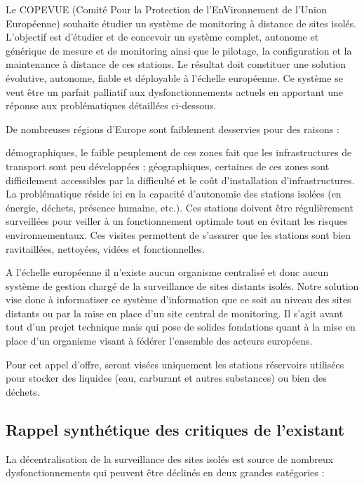 \documentclass[a4paper]{article}
\begin{document}
Le COPEVUE (Comité Pour la Protection de l'EnVironnement de l'Union Européenne) souhaite étudier un système de monitoring à distance de sites isolés. L'objectif est d'étudier et de concevoir un système complet, autonome et générique de mesure et de monitoring ainsi que le pilotage, la configuration et la maintenance à distance de ces stations. Le résultat doit constituer une solution évolutive, autonome, fiable et déployable à l'échelle européenne. Ce système se veut être un parfait palliatif aux dysfonctionnements actuels en apportant une réponse aux problématiques détaillées ci-dessous.

De nombreuses régions d'Europe sont faiblement desservies pour des raisons :

démographiques, le faible peuplement de ces zones fait que les infrastructures de transport sont peu développées ;
géographiques, certaines de ces zones sont difficilement accessibles par la difficulté et le coût d'installation d'infrastructures.
La problématique réside ici en la capacité d'autonomie des stations isolées (en énergie, déchets, présence humaine, etc.). Ces stations doivent être régulièrement surveillées pour veiller à un fonctionnement optimale tout en évitant les risques environnementaux. Ces visites permettent de s'assurer que les stations sont bien ravitaillées, nettoyées, vidées et fonctionnelles.

A l'échelle européenne il n'existe aucun organisme centralisé et donc aucun système de gestion chargé de la surveillance de sites distants isolés. Notre solution vise donc à informatiser ce système d'information que ce soit au niveau des sites distants ou par la mise en place d'un site central de monitoring. Il s'agit avant tout d'un projet technique mais qui pose de solides fondations quant à la mise en place d'un organisme visant à fédérer l'ensemble des acteurs européens.

Pour cet appel d'offre, seront visées uniquement les stations réservoirs utilisées pour stocker des liquides (eau, carburant et autres substances) ou bien des déchets.

\subsection{Rappel synthétique des critiques de l’existant}

La décentralisation de la surveillance des sites isolés est source de nombreux dysfonctionnements qui peuvent être déclinés en deux grandes catégories :
\end{document}
